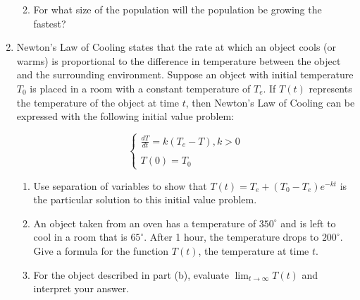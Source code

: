 \documentclass[12pt]{article}
\newif\ifans
\begin{document}
\begin{enumerate}
\begin{enumerate}
\ifans{\fbox{\parbox{1\linewidth}{The constant solutions correspond to $\frac{dy}{dt}=0$.  This occurs for $y=0$ and $y=L$.  If $y=0$, the population is at size 0.  And, if $y=L$, the population is at the system's carrying capacity.  Either way, there is no growth.}}} \fi

\item For what size of the population will the population be growing the fastest?

\ifans{\fbox{The population is growing fastest when $y=\frac{L}{2}$; Detailed Solution: \textcolor{blue}{\href{http://www.math.drexel.edu/classes/Calculus/resources/Math123HW/Solutions/123_02_Modeling_09.pdf}{Here}}}} \fi

\end{enumerate}

\item Newton's Law of Cooling states that the rate at which an object cools (or warms) is proportional to the difference in temperature between the object and the surrounding environment.  Suppose an object with initial temperature $T_0$ is placed in a room with a constant temperature of $T_e$.  If $T(t)$ represents the temperature of the object at time $t$, then Newton's Law of Cooling can be expressed with the following initial value problem:

$$\left\{\begin{array}{l}
\frac{dT}{dt}=k(T_e-T), k>0\\
\\
T(0)=T_0
\end{array}\right.$$

\begin{enumerate}

\item Use separation of variables to show that $T(t)=T_e + (T_0 - T_e)e^{-kt}$ is the particular solution to this initial value problem.

\item An object taken from an oven has a temperature of $350^{\circ}$ and is left to cool in a room that is $65^{\circ}$.  After 1 hour, the temperature drops to $200^{\circ}$.  Give a formula for the function $T(t)$, the temperature at time $t$.

\ifans{\fbox{$T(t)=285\left(\frac{9}{19}\right)^t+65$}} \fi

\item For the object described in part (b), evaluate $\lim_{t \rightarrow \infty}{T(t)}$ and interpret your answer.

\ifans{\fbox{$\lim_{t \rightarrow \infty}{T(t)}=65$.  So over time the object will approach the temperature of the room.}} \fi

\end{enumerate}

\end{enumerate}
\end{document}
